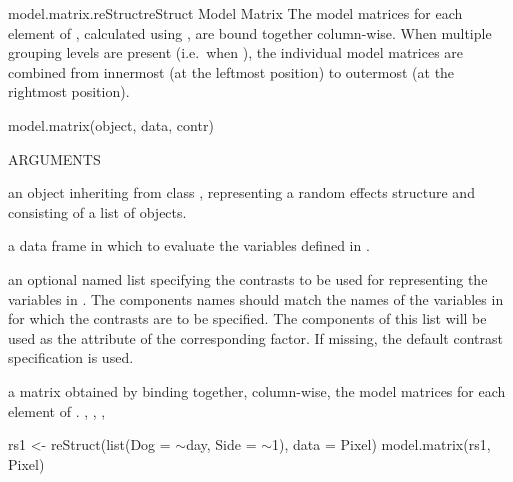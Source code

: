 \documentclass[pdftex]{article} \usepackage{url,graphicx}
\renewcommand{\Twiddle}{\mbox{\(\sim\)}}
\begin{document}
\begin{Helpfile}{model.matrix.reStruct}{reStruct Model Matrix}
The model matrices for each element of ,
calculated using , are bound together column-wise. When
multiple grouping levels are present (i.e.\ when ),
 the individual model matrices are combined from innermost (at
the leftmost position) to outermost (at the rightmost position).
\begin{Example}
model.matrix(object, data, contr)
\end{Example}
\begin{Argument}{ARGUMENTS}
\item[\Co{object:}]
an object inheriting from class ,
representing a random effects structure and consisting of a list of
 objects.
\item[\Co{data:}]
a data frame in which to evaluate the variables defined in
.
\item[\Co{contr:}]
an optional named list specifying the contrasts to be used
for representing the  variables in . The
components names should match the names of the variables in
 for which the contrasts are to be specified. The
components of this list will be used as the 
attribute of the corresponding factor. If missing, the default
contrast specification is used.
\end{Argument}
a matrix obtained by binding together, column-wise, the model matrices
for each element of .
, ,
, 
\need 15pt
\vspace{-16pt} 
\begin{Example}
rs1 <- reStruct(list(Dog = \Twiddle day, Side = \Twiddle 1), data = Pixel)
model.matrix(rs1, Pixel)
\end{Example}
\end{Helpfile}
\end{document}
